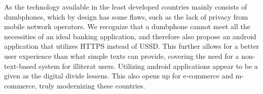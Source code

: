 \documentclass[11pt, a4paper]{article}
\begin{document}
As the technology available in the least developed countries mainly consists of dumbphones, which by design has some flaws, such as the lack of privacy from mobile network operators. We recognize that a dumbphone cannot meet all the necessities of an ideal banking application, and therefore also propose an android application that utilizes HTTPS instead of USSD. This further allows for a better user experience than what simple texts can provide, covering the need for a non-text-based system for illiterat users. Utilizing android applications appear to be a given as the digital divide lessens. This also opens up for e-commerce and m-commerce, truly modernizing these countries.

\clearpage
\begingroup
\let\cleardoublepage\clearpage
{}


\endgroup
\clearpage
\end{document}
